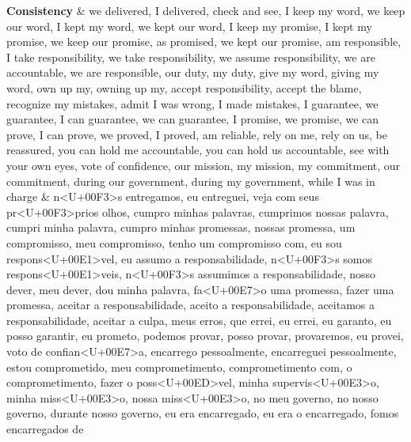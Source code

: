 \documentclass[smallextended]{svjour3}       %
\begin{document}
\begin{landscape}
\begin{longtabu}
\textbf{Consistency} & we delivered, I delivered, check and see, I keep my word, we keep our word, I kept my word, we kept our word, I keep my promise, I kept my promise, we keep our promise, as promised, we kept our promise, am responsible, I take responsibility, we take responsibility, we assume responsibility, we are accountable, we are responsible, our duty, my duty, give my word, giving my word, own up my, owning up my, accept responsibility, accept the blame, recognize my mistakes, admit I was wrong, I made mistakes, I guarantee, we guarantee, I can guarantee, we can guarantee, I promise, we promise, we can prove, I can prove, we proved, I proved, am reliable, rely on me, rely on us, be reassured, you can hold me accountable, you can hold us accountable, see with your own eyes, vote of confidence, our mission, my mission, my commitment, our commitment, during our government, during my government, while I was in charge & n<U+00F3>s entregamos, eu entreguei, veja com seus pr<U+00F3>prios olhos, cumpro minhas palavras, cumprimos nossas palavra, cumpri minha palavra, cumpro minhas promessas, nossas promessa, um compromisso, meu compromisso, tenho um compromisso com, eu sou respons<U+00E1>vel, eu assumo a responsabilidade, n<U+00F3>s somos respons<U+00E1>veis, n<U+00F3>s assumimos a responsabilidade, nosso dever, meu dever, dou minha palavra, fa<U+00E7>o uma promessa, fazer uma promessa, aceitar a responsabilidade, aceito a responsabilidade, aceitamos a responsabilidade, aceitar a culpa, meus erros, que errei, eu errei, eu garanto, eu posso garantir, eu prometo, podemos provar, posso provar, provaremos, eu provei, voto de confian<U+00E7>a, encarrego pessoalmente, encarreguei pessoalmente, estou comprometido, meu comprometimento, comprometimento com, o comprometimento, fazer o poss<U+00ED>vel, minha supervis<U+00E3>o, minha miss<U+00E3>o, nossa miss<U+00E3>o, no meu governo, no nosso governo, durante nosso governo, eu era encarregado, eu era o encarregado, fomos encarregados de\\

\end{longtabu}
\end{landscape}
\end{document}
